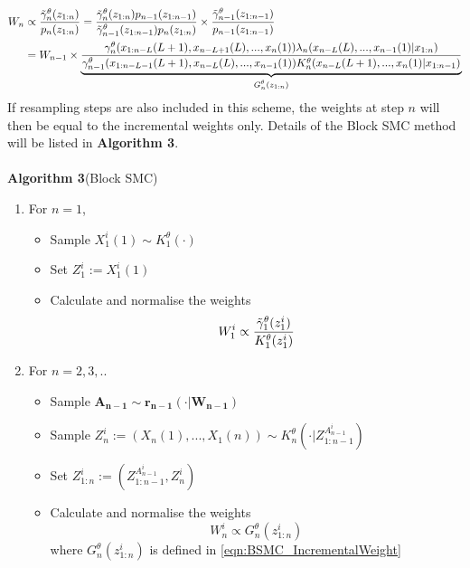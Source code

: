 \documentclass[12pt,a4paper]{article}
\begin{document}
\begin{equation}
\label{eqn:BSMC_IncrementalWeight}
    \begin{split}
        W_n &\propto \frac{\Tilde{\gamma}^{\theta}_n(z_{1:n})}{p_n(z_{1:n})} = \frac{\Tilde{\gamma}^{\theta}_n(z_{1:n})p_{n-1}(z_{1:n-1})}{\Tilde{\gamma}^{\theta}_{n-1}(z_{1:n-1})p_n(z_{1:n})}\times \frac{\Tilde{\gamma}^{\theta}_{n-1}(z_{1:n-1})}{p_{n-1}(z_{1:n-1})}\\
        &=W_{n-1}\times\underbrace{\frac{\gamma_n^{\theta}(x_{1:n-L}(L+1),x_{n-L+1}(L),...,x_n(1))\lambda_n(x_{n-L}(L),...,x_{n-1}(1)|x_{1:n})}{\gamma_{n-1}^{\theta}(x_{1:n-L-1}(L+1),x_{n-L}(L),...,x_{n-1}(1))K_n^{\theta}(x_{n-L}(L+1),...,x_{n}(1)|x_{1:n-1})}}_\text{$G_n^{\theta}(z_{1:n})$}
    \end{split}
\end{equation}
If resampling steps are also included in this scheme, the weights at step $n$ will then be equal to the incremental weights only. Details of the Block SMC method will be listed in \textbf{Algorithm 3}.  
\\\\
\textbf{Algorithm 3}(Block SMC)
\begin{enumerate}
    \item For $n=1$,
    \begin{itemize}
        \item Sample $X_1^i(1) \sim K_1^{\theta}(\cdot)$
        \item Set $Z_1^i := X_1^i(1)$
        \item Calculate and normalise the weights
        $$W_1^i \propto \frac{\Tilde{\gamma}_1^{\theta}(z_1^i)}{K_1^{\theta}(z_1^i)}$$
    \end{itemize}
    \item For $n = 2,3,..$
    \begin{itemize}
        \item Sample $\mathbf{A_{n-1}} \sim \mathbf{r_{n-1}}(\cdot|\mathbf{W_{n-1}})$
        \item Sample $Z_{n}^i:=(X_n(1),...,X_1(n)) \sim K_n^{\theta}(\cdot|Z_{1:n-1}^{A_{n-1}^i})$
        \item Set $Z_{1:n}^i := \left(Z_{1:n-1}^{A_{n-1}^i},Z_n^i\right)$
        \item Calculate and normalise the weights 
        $$W_n^i \propto G_n^{\theta}(z_{1:n}^i)$$
        where $G_n^{\theta}(z_{1:n}^i)$ is defined in \eqref{eqn:BSMC_IncrementalWeight}
        
    \end{itemize}
\end{enumerate}
\end{document}
